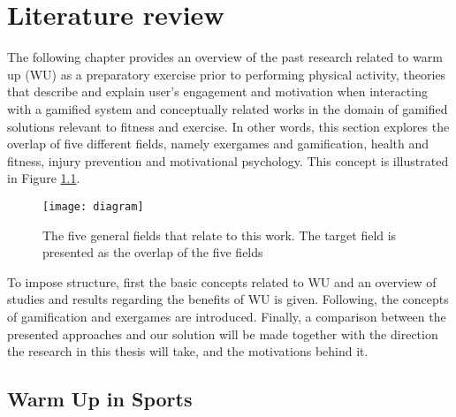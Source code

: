 \chapter{Literature review}\label{chapter:relatedwork}
The following chapter provides an overview of the past research related to warm up (WU) as a preparatory exercise prior to performing physical activity, theories that describe and explain user's engagement and motivation when interacting with a gamified system and conceptually related works in the domain of gamified solutions relevant to fitness and exercise. In other words, this section explores the overlap of five different fields, namely exergames and gamification, health and fitness, injury prevention and motivational psychology. This concept is illustrated in Figure \ref{fig:diagram}.
\begin{figure}[h]
    \centering
    \texttt{[image: diagram]}
    \caption{The five general fields that relate to this work. The target field is presented as the overlap of the five fields}
    \label{fig:diagram}
\end{figure}
To impose structure, first the basic concepts related to WU and an overview of studies and results regarding the benefits of WU is given. Following, the concepts of gamification and exergames are introduced. Finally, a comparison between the presented approaches and our solution will be made together with the direction the
research in this thesis will take, and the motivations behind it.
\section{Warm Up in Sports}
